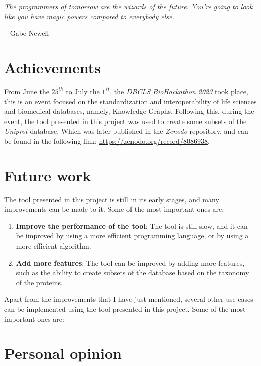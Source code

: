 \epigraph{\textit{The programmers of tomorrow are the wizards of the future. You're going to look like you have magic powers compared to everybody else.}}{-- \textup{Gabe Newell}}

\section{Achievements}

From June the $25^{th}$ to July the $1^{st}$, the \textit{DBCLS BioHackathon 2023} took place, this is an event focused on the standardization and interoperability of life sciences and biomedical databases, namely, Knowledge Graphs. Following this, during the event, the tool presented in this project was used to create some subsets of the \textit{Uniprot} database. Which was later published in the \textit{Zenodo} repository, and can be found in the following link: \url{https://zenodo.org/record/8086938}.

\section{Future work}

The tool presented in this project is still in its early stages, and many improvements can be made to it. Some of the most important ones are:

\begin{enumerate}
    \itemsep0.5em
    \item \textbf{Improve the performance of the tool}: The tool is still slow, and it can be improved by using a more efficient programming language, or by using a more efficient algorithm.
    \item \textbf{Add more features}: The tool can be improved by adding more features, such as the ability to create subsets of the database based on the taxonomy of the proteins.
\end{enumerate}

Apart from the improvements that I have just mentioned, several other use cases can be implemented using the tool presented in this project. Some of the most important ones are:

\section{Personal opinion}